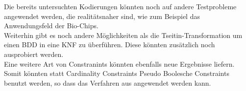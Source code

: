 \documentclass[a4,abstract=on]{scrartcl}
\begin{document}
Die bereits untersuchten Kodierungen könnten noch auf andere Testprobleme angewendet werden, die realitätsnaher sind, wie zum Beispiel das Anwendungsfeld der Bio-Chips.\\
Weiterhin gibt es noch andere Möglichkeiten als die Tseitin-Transformation um einen BDD in eine KNF zu überführen. Diese könnten zusätzlich noch ausprobiert werden.\\
Eine weitere Art von Constranints könnten ebenfalls neue Ergebnisse liefern. Somit könnten statt Cardinality Constraints Pseudo Boolesche Constraints benutzt werden, so dass das Verfahren aus \cite[][Seite 15,16]{niklasse} angewendet werden kann.




\end{document}
